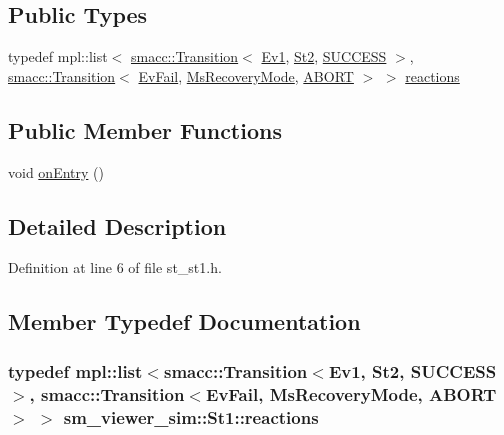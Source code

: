 \subsection*{Public Types}
\begin{DoxyCompactItemize}
\item 
typedef mpl\+::list$<$ \hyperlink{classsmacc_1_1Transition}{smacc\+::\+Transition}$<$ \hyperlink{structsm__viewer__sim_1_1Ev1}{Ev1}, \hyperlink{structsm__viewer__sim_1_1St2}{St2}, \hyperlink{structsmacc_1_1default__transition__tags_1_1SUCCESS}{S\+U\+C\+C\+E\+SS} $>$, \hyperlink{classsmacc_1_1Transition}{smacc\+::\+Transition}$<$ \hyperlink{structsm__viewer__sim_1_1EvFail}{Ev\+Fail}, \hyperlink{structsm__viewer__sim_1_1MsRecoveryMode}{Ms\+Recovery\+Mode}, \hyperlink{structsmacc_1_1default__transition__tags_1_1ABORT}{A\+B\+O\+RT} $>$ $>$ \hyperlink{structsm__viewer__sim_1_1St1_a82ca5605e0c9df84a733d590a3c921d8}{reactions}
\end{DoxyCompactItemize}
\subsection*{Public Member Functions}
\begin{DoxyCompactItemize}
\item 
void \hyperlink{structsm__viewer__sim_1_1St1_ab4651cd52d9db7f7e8a4496d8214bfbe}{on\+Entry} ()
\end{DoxyCompactItemize}


\subsection{Detailed Description}


Definition at line 6 of file st\+\_\+st1.\+h.



\subsection{Member Typedef Documentation}
\subsubsection[{\texorpdfstring{reactions}{reactions}}]{\setlength{\rightskip}{0pt plus 5cm}typedef mpl\+::list$<${\bf smacc\+::\+Transition}$<${\bf Ev1}, {\bf St2}, {\bf S\+U\+C\+C\+E\+SS}$>$, {\bf smacc\+::\+Transition}$<${\bf Ev\+Fail}, {\bf Ms\+Recovery\+Mode}, {\bf A\+B\+O\+RT}$>$ $>$ {\bf sm\+\_\+viewer\+\_\+sim\+::\+St1\+::reactions}}\hypertarget{structsm__viewer__sim_1_1St1_a82ca5605e0c9df84a733d590a3c921d8}{}\label{structsm__viewer__sim_1_1St1_a82ca5605e0c9df84a733d590a3c921d8}


